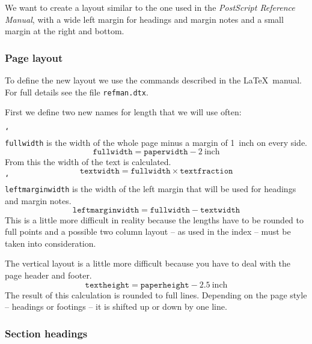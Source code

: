 \documentclass[twoside,a4paper]{refart}
\DeclareRobustCommand\cs[1]{\texttt{\char`\\#1}}
\begin{document}
We want to create a layout similar to the one used in the \textit{PostScript 
Reference Manual}, with a wide left margin for headings and margin 
notes and a small margin at the right and bottom.

\subsubsection{Page layout}

To define the new layout we use the commands described in the \LaTeX\ 
manual. For full details see the file \texttt{refman.dtx}.


First we define two new names for length that we will use often:

\cs{fullwidth} is the width of the whole page minus a margin of 1~inch 
on every side. 
%
\begin{displaymath}
\texttt{fullwidth} = \texttt{paperwidth} - 2\ \textrm{inch}
\end{displaymath}
%
From this the width of the text is calculated.
%
\begin{displaymath}
\texttt{textwidth} = \texttt{fullwidth} \times \texttt{textfraction}
\end{displaymath}
%
\cs{leftmarginwidth} is the width of the left margin that will be 
used for headings and margin notes. 
\begin{displaymath}
\texttt{leftmarginwidth} = \texttt{fullwidth} - \texttt{textwidth}
\end{displaymath}
%
This is a little more difficult in reality because the lengths have to 
be rounded to full points and a possible two column layout -- as used 
in the index -- must be taken into consideration.

The vertical layout is a little more difficult because you have to 
deal with the page header and footer. 
%
\begin{displaymath}
\texttt{textheight} = \texttt{paperheight} - 2.5\ \textrm{inch}
\end{displaymath}
%
The result of this calculation is rounded to full lines. Depending on 
the page style -- headings or footings -- it is shifted up or down by one 
line.

\vspace{0pt plus 1cm}

\subsubsection{Section headings}
\end{document}
